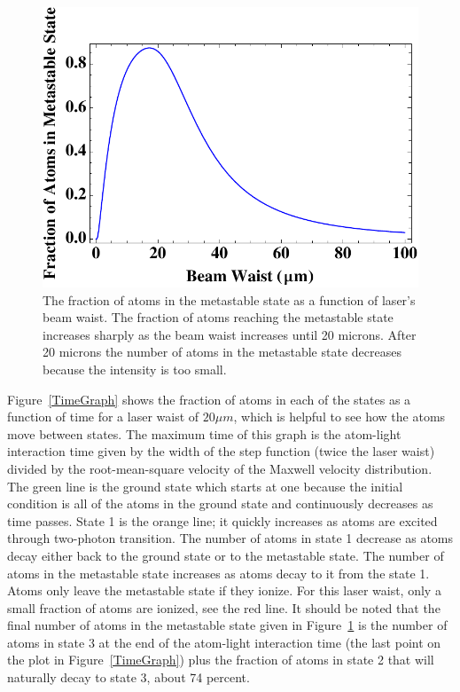 \documentclass[prb,preprint]{revtex4-1}
\begin{document}
\begin{figure}[h!]
\centering
\includegraphics[width=6in]{MetaGraph1.pdf}
\caption{The fraction of atoms in the metastable state as a function of laser's beam waist. The fraction of atoms reaching the metastable state increases sharply as the beam waist increases until 20 microns. After 20 microns the number of atoms in the metastable state decreases because the intensity is too small.}
\label{MetaGraph1}
\end{figure}

Figure~\ref{TimeGraph} shows the fraction of atoms in each of the states as a function of time for a laser waist of $20 \mu m$, which is helpful to see how the atoms move between states. The maximum time of this graph is the atom-light interaction time given by the width of the step function (twice the laser waist) divided by the root-mean-square velocity of the Maxwell velocity distribution.  The green line is the ground state which starts at one because the initial condition is all of the atoms in the ground state and continuously decreases as time passes. State 1 is the orange line; it quickly increases as atoms are excited through two-photon transition. The number of atoms in state 1 decrease as atoms decay either back to the ground state or to the metastable state. The number of atoms in the metastable state increases as atoms decay to it from the state 1. Atoms only leave the metastable state if they ionize. For this laser waist, only a small fraction of atoms are ionized, see the red line.  It should be noted that the final number of atoms in the metastable state given in Figure~\ref{MetaGraph1} is the number of atoms in state 3 at the end of the atom-light interaction time (the last point on the plot in Figure~\ref{TimeGraph}) plus the fraction of atoms in state 2 that will naturally decay to state 3, about 74 percent.
\end{document}
